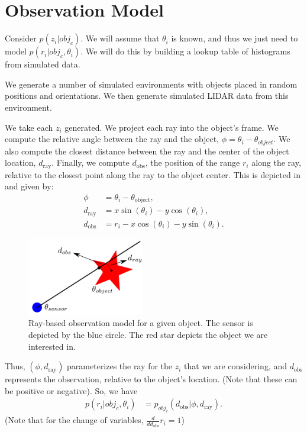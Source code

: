 \section{Observation Model}

Consider $p( z_i | obj_c)$. We will assume that $\theta_i$ is known, and thus we
just need to model $p( r_i | obj_c, \theta_i)$. We will do this by building a
lookup table of histograms from simulated data.

We generate a number of simulated environments with objects placed in random
positions and orientations. We then generate simulated LIDAR data from this
environment.

We take each $z_i$ generated. We project each ray into the object's frame. We
compute the relative angle between the ray and the object, $\phi = \theta_i -
\theta_{object}$. We also compute the closest distance between the ray and the
center of the object location, $d_{\text{ray}}$. Finally, we compute
$d_{\text{obs}}$, the position of the range $r_i$ along the ray, relative to the
closest point along the ray to the object center. This is depicted in
 and given by:
%
\begin{align}
  \phi            &= \theta_i  - \theta_{\text{object}}        \text{,} \\
  d_{\text{ray}}  &= x \sin(\theta_i) - y \cos(\theta_i)       \text{,} \\
  d_{\text{obs}}  &= r_i - x \cos(\theta_i) - y \sin(\theta_i) \text{.}
\end{align}
%
\begin{figure}
  \centering
  \includegraphics[width=2in]{figures/ray_model.pdf}
  \caption{Ray-based observation model for a given object. The sensor is
    depicted by the blue circle. The red star depicts the object we are
    interested in.}
  \label{fig:obs_model}
\end{figure}
%
Thus, $(\phi, d_{\text{ray}})$ parameterizes the ray for the $z_i$ that we are
considering, and $d_{\text{obs}}$ represents the observation, relative to the
object's location. (Note that these can be positive or negative). So, we have
%
\begin{align}
  p( r_i | obj_c, \theta_i) &=
    p_{obj_c}( d_{\text{obs}} | \phi, d_{\text{ray}} )
  \text{.}
\end{align}
%
(Note that for the change of variables, $\frac{d}{d d_{\text{obs}}} r_i = 1$)

